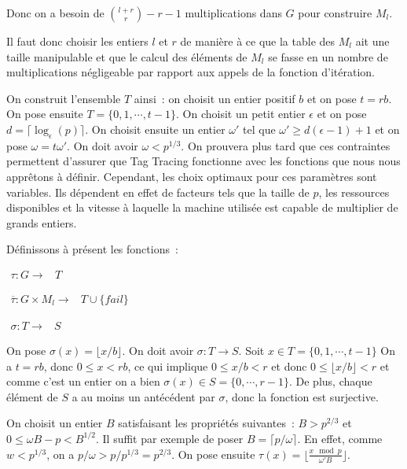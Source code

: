     Donc on a besoin de $\binom{l+r}{r} - r - 1$ multiplications dans $G$ pour construire $M_l$.

    Il faut donc choisir les entiers $l$ et $r$ de manière à ce que la table des $M_l$ ait une taille manipulable et que le calcul des éléments de $M_l$ se fasse en un nombre de multiplications négligeable par rapport aux appels de la fonction d'itération.

    On construit l'ensemble $T$ ainsi~: on choisit un entier positif $b$ et on pose $t = rb$. On pose ensuite $T = \{0,1,\cdots,t-1\}$. On choisit un petit entier $\epsilon$ et on pose $d = \lceil\log_\epsilon(p)\rceil$. On choisit ensuite un entier $\omega'$ tel que $\omega' \ge d(\epsilon - 1) + 1$ et on pose $\omega = t\omega'$. On doit avoir $\omega < p^{1/3}$. On prouvera plus tard que ces contraintes permettent d'assurer que Tag Tracing fonctionne avec les fonctions que nous nous apprêtons à définir. Cependant, les choix optimaux pour ces paramètres sont variables. Ils dépendent en effet de facteurs tels que la taille de $p$, les ressources disponibles et la vitesse à laquelle la machine utilisée est capable de multiplier de grands entiers.

    Définissons à présent les fonctions~:

    $\begin{array}{lrcl}
      \tau : G \longrightarrow & T
    \end{array}$

    $\begin{array}{lrcl}
      \overline{\tau} : G \times M_l \longrightarrow & T \cup \{fail\}
    \end{array}$

    $\begin{array}{lrcl}
      \sigma : T \longrightarrow & S
    \end{array}$

    On pose $\sigma(x) = \lfloor x/b \rfloor$. On doit avoir $\sigma : T \longrightarrow S$. Soit $x \in T = \{0,1,\cdots,t-1\}$ On a $t = rb$, donc $0 \leq x < rb$, ce qui implique $0 \leq x/b < r$ et donc $0 \leq \lfloor x/b \rfloor < r$ et comme c'est un entier on a bien $\sigma(x) \in S=\{0,\cdots,r-1\}$. De plus, chaque élément de $S$ a au moins un antécédent par $\sigma$, donc la fonction est surjective.

    On choisit un entier $B$ satisfaisant les propriétés suivantes~:  $B > p^{2/3}$ et $0 \leq \omega B - p < B^{1/2}$. Il suffit par exemple de poser $B = \lceil p/\omega \rceil$. En effet, comme $w < p^{1/3}$, on a $p/\omega > p/p^{1/3} = p^{2/3}$. On pose ensuite $\tau(x) = \lfloor \frac{x\mod p}{\omega' B} \rfloor$.

